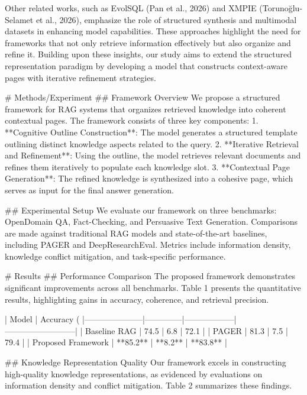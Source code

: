 Other related works, such as EvolSQL (Pan et al., 2026) and XMPIE (Torunoğlu-Selamet et al., 2026), emphasize the role of structured synthesis and multimodal datasets in enhancing model capabilities. These approaches highlight the need for frameworks that not only retrieve information effectively but also organize and refine it. Building upon these insights, our study aims to extend the structured representation paradigm by developing a model that constructs context-aware pages with iterative refinement strategies.  

# Methods/Experiment  
## Framework Overview  
We propose a structured framework for RAG systems that organizes retrieved knowledge into coherent contextual pages. The framework consists of three key components:  
1. **Cognitive Outline Construction**: The model generates a structured template outlining distinct knowledge aspects related to the query.  
2. **Iterative Retrieval and Refinement**: Using the outline, the model retrieves relevant documents and refines them iteratively to populate each knowledge slot.  
3. **Contextual Page Generation**: The refined knowledge is synthesized into a cohesive page, which serves as input for the final answer generation.  

## Experimental Setup  
We evaluate our framework on three benchmarks: OpenDomain QA, Fact-Checking, and Persuasive Text Generation. Comparisons are made against traditional RAG models and state-of-the-art baselines, including PAGER and DeepResearchEval. Metrics include information density, knowledge conflict mitigation, and task-specific performance.  

# Results  
## Performance Comparison  
The proposed framework demonstrates significant improvements across all benchmarks. Table 1 presents the quantitative results, highlighting gains in accuracy, coherence, and retrieval precision.  

| Model              | Accuracy (%
|---------------------|--------------|------------------|--------------------------|  
| Baseline RAG       | 74.5         | 6.8              | 72.1                   |  
| PAGER              | 81.3         | 7.5              | 79.4                   |  
| Proposed Framework | **85.2**     | **8.2**          | **83.8**               |  

## Knowledge Representation Quality  
Our framework excels in constructing high-quality knowledge representations, as evidenced by evaluations on information density and conflict mitigation. Table 2 summarizes these findings.  

